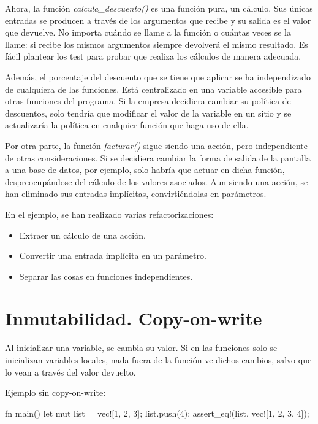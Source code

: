 Ahora, la función \textit{calcula\_descuento()} es una función pura, un cálculo. Sus únicas entradas se producen a través de los argumentos que recibe y su salida es el valor que devuelve. No importa cuándo se llame a la función o cuántas veces se la llame: si recibe los mismos argumentos siempre devolverá el mismo resultado. Es fácil plantear los test para probar que realiza los cálculos de manera adecuada. 

Además, el porcentaje del descuento que se tiene que aplicar se ha independizado de cualquiera de las funciones. Está centralizado en una variable accesible para otras funciones del programa. Si la empresa decidiera cambiar su política de descuentos, solo tendría que modificar el valor de la variable en un sitio y se actualizaría la política en cualquier función que haga uso de ella.

Por otra parte, la función \textit{facturar()} sigue siendo una acción, pero independiente de otras consideraciones. Si se decidiera cambiar la forma de salida de la pantalla a una base de datos, por ejemplo, solo habría que actuar en dicha función, despreocupándose del cálculo de los valores asociados. Aun siendo una acción, se han eliminado sus entradas implícitas, convirtiéndolas en parámetros.

En el ejemplo, se han realizado varias refactorizaciones:
\begin{itemize}
   \item Extraer un cálculo de una acción.
   \item Convertir una entrada implícita en un parámetro.
   \item Separar las cosas en funciones independientes.
\end{itemize}

\section{Inmutabilidad. Copy-on-write}
\noindent Al inicializar una variable, se cambia su valor. Si en las funciones solo se inicializan variables locales, nada fuera de la función ve dichos cambios, salvo que lo vean a través del valor devuelto. 

Ejemplo sin copy-on-write:

\vspace{0.7em}
\begin{Codigo}
   fn main() {
      let mut list = vec![1, 2, 3];
      list.push(4);
      assert_eq!(list, vec![1, 2, 3, 4]);
   }
\end{Codigo}

